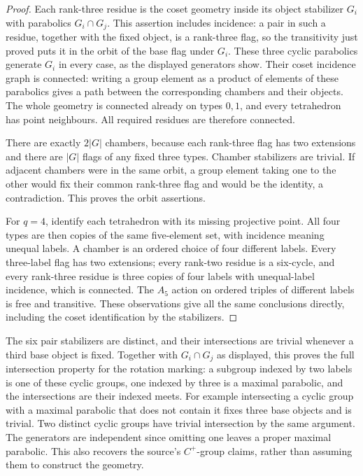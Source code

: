 \begin{proof}
Each rank-three residue is the coset geometry inside its object
stabilizer $G_i$ with parabolics $G_i\cap G_j$. This assertion
includes incidence: a pair in such a residue, together with the
fixed object, is a rank-three flag, so the transitivity just
proved puts it in the orbit of the base flag under $G_i$.
These three cyclic parabolics generate $G_i$ in every case, as
the displayed generators show. Their coset incidence graph is
connected: writing a group element as a product of elements of
these parabolics gives a path between the corresponding chambers
and their objects. The whole geometry is connected already on
types $0,1$, and every tetrahedron has point neighbours. All
required residues are therefore connected.

There are exactly $2|G|$ chambers, because each rank-three flag
has two extensions and there are $|G|$ flags of any fixed three
types. Chamber stabilizers are trivial. If adjacent chambers
were in the same orbit, a group element taking one to the other
would fix their common rank-three flag and would be the identity,
a contradiction. This proves the orbit assertions.

For $q=4$, identify each tetrahedron with its missing projective
point. All four types are then copies of the same five-element
set, with incidence meaning unequal labels. A chamber is an
ordered choice of four different labels. Every three-label flag
has two extensions; every rank-two residue is a six-cycle, and
every rank-three residue is three copies of four labels with
unequal-label incidence, which is connected. The $A_5$ action
on ordered triples of different labels is free and transitive.
These observations give all the same conclusions directly,
including the coset identification by the stabilizers.
\end{proof}

The six pair stabilizers are distinct, and their intersections
are trivial whenever a third base object is fixed. Together with
$G_i\cap G_j$ as displayed, this proves the full intersection
property for the rotation marking: a subgroup indexed by two
labels is one of these cyclic groups, one indexed by three is a
maximal parabolic, and the intersections are their indexed meets.
For example intersecting a cyclic group with a maximal parabolic
that does not contain it fixes three base objects and is trivial.
Two distinct cyclic groups have trivial intersection by the same
argument. The generators are independent since omitting one
leaves a proper maximal parabolic. This also recovers the source's
$C^+$-group claims, rather than assuming them to construct the
geometry.

